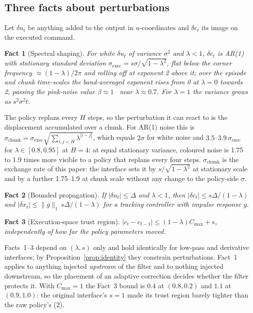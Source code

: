 \documentclass{article}
\newtheorem{fact}{Fact}
\newcommand{\sexec}{\sigma_{\mathrm{exec}}}
\newcommand{\schunk}{\sigma_{\mathrm{chunk}}}
\begin{document}
\subsection{Three facts about perturbations}

Let $\delta u_t$ be anything added to the output in $u$-coordinates and $\delta c_t$ its image on the executed command.

\begin{fact}[Spectral shaping]
\label{fact:spectrum}
For white $\delta u_t$ of variance $\sigma^2$ and $\lambda<1$, $\delta c_t$ is AR(1) with stationary standard deviation $\sexec=s\sigma/\sqrt{1-\lambda^2}$, flat below the corner frequency $\approx(1-\lambda)/2\pi$ and rolling off at exponent 2 above it; over the episode and chunk time-scales the band-averaged exponent rises from 0 at $\lambda=0$ towards 2, passing the pink-noise value $\beta\approx1$~\citep{eberhard2023pink} near $\lambda\approx0.7$. For $\lambda=1$ the variance grows as $s^2\sigma^2t$.
\end{fact}
The policy replans every $H$ steps, so the perturbation it can react to is the displacement accumulated over a chunk. For AR(1) noise this is $\schunk=\sexec\sqrt{\sum_{i,j<H}\lambda^{|i-j|}}$, which equals $2\sigma$ for white noise and $3.5$--$3.9\,\sexec$ for $\lambda\in[0.8,0.95]$ at $H=4$: at equal stationary variance, coloured noise is 1.75 to 1.9 times more visible to a policy that replans every four steps. $\schunk$ is the exchange rate of this paper: the interface sets it by $s/\sqrt{1-\lambda^2}$ at stationary scale and by a further 1.75--1.9 at chunk scale without any change to the policy-side $\sigma$.

\begin{fact}[Bounded propagation]
If $|\delta u_t|\le\Delta$ and $\lambda<1$, then $|\delta c_t|\le s\Delta/(1-\lambda)$ and $|\delta x_t|\le\|g\|_1\,s\Delta/(1-\lambda)$ for a tracking controller with impulse response $g$.
\end{fact}

\begin{fact}[Execution-space trust region]
$|c_t-c_{t-1}|\le(1-\lambda)C_{\max}+s$, independently of how far the policy parameters moved.
\end{fact}

Facts~1--3 depend on $(\lambda,s)$ only and hold identically for low-pass and derivative interfaces; by Proposition~\ref{prop:identity} they constrain perturbations. Fact~1 applies to anything injected \emph{upstream} of the filter and to nothing injected downstream, so the placement of an adaptive correction decides whether the filter protects it. With $C_{\max}=1$ the Fact~3 bound is $0.4$ at $(0.8,0.2)$ and $1.1$ at $(0.9,1.0)$: the original interface's $s=1$ made its trust region barely tighter than the raw policy's ($2$).
\end{document}
